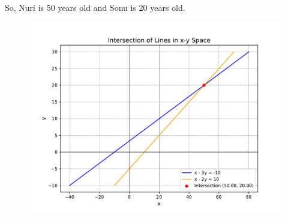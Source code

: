 \documentclass[journal,12pt,onecolumn]{IEEEtran}
\theoremstyle{remark}
\begin{document}
So, Nuri is 50 years old and Sonu is 20 years old.

\begin{figure}[h]
	\centering
	\includegraphics[width=\columnwidth]{figs/fig.pdf}
\end{figure}
\end{document}
